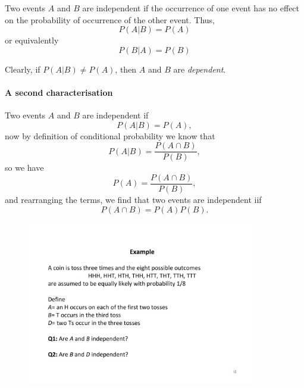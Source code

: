 \documentclass[notes=show, handout]{beamer}\usepackage[]{graphicx}\usepackage[]{color}
\begin{document}
\begin{frame}{\secname}
  \begin{definition}
  Two events $A$ and $B$ are independent if the occurrence of one event has no effect on the probability of occurrence of the other event. Thus,
  $$
  P(A\vert B) = P(A)
  $$
  or equivalently
  $$
  P(B\vert A) = P(B)
  $$
  \end{definition}
  Clearly, if $P(A\vert B) \neq P(A)$, then $A$ and $B$ are \textit{dependent}.
\end{frame}


\begin{frame}{\secname}
  \framesubtitle{A second characterisation}
  Two events $A$ and $B$ are independent if
  $$
  P(A \vert B) = {P(A)},
  $$
  now by definition of conditional probability we know that
  $$
  P(A \vert B) = \frac{P(A \cap B)}{P(B)},
  $$
  so we have
  $$
  P(A) = \frac{P(A \cap B)}{P(B)},
  $$
  and rearranging the terms, we find that two events are independent iif
  $$
  P(A\cap B) = P(A) P(B).
  $$
\end{frame}

\begin{frame}{\secname}
  \begin{example}
  \begin{figure}[h!]
  \centering
  \includegraphics[width=0.9\textwidth,height=0.7\textheight]{img/example7.pdf}
  \end{figure}
  \end{example}
\end{frame}
\end{document}
